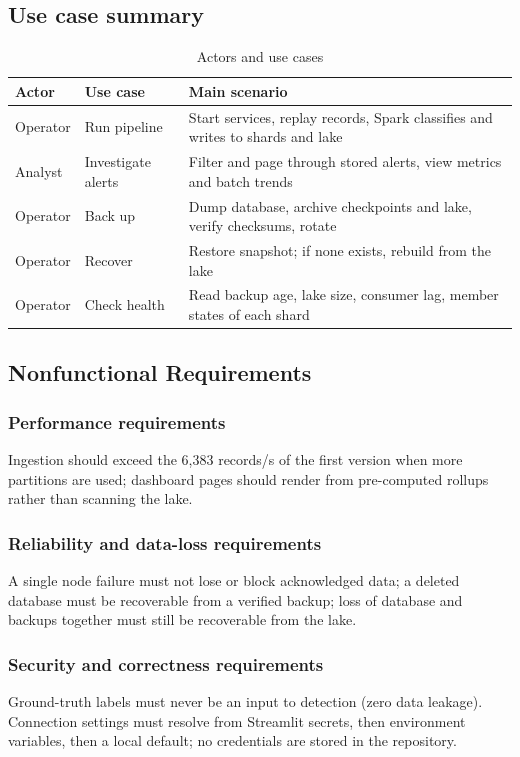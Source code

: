 \subsection{Use case summary}
\begin{table}[H]
\centering
\begin{tabular}{|p{2.6cm}|p{3.2cm}|p{7.5cm}|}
\hline
\textbf{Actor} & \textbf{Use case} & \textbf{Main scenario} \\ \hline
Operator & Run pipeline & Start services, replay records, Spark classifies and writes to shards and lake \\ \hline
Analyst & Investigate alerts & Filter and page through stored alerts, view metrics and batch trends \\ \hline
Operator & Back up & Dump database, archive checkpoints and lake, verify checksums, rotate \\ \hline
Operator & Recover & Restore snapshot; if none exists, rebuild from the lake \\ \hline
Operator & Check health & Read backup age, lake size, consumer lag, member states of each shard \\ \hline
\end{tabular}
\caption{Actors and use cases}
\end{table}

\subsection{Nonfunctional Requirements}
\subsubsection{Performance requirements}
Ingestion should exceed the 6,383 records/s of the first version when more partitions are used; dashboard pages should render from pre-computed rollups rather than scanning the lake.

\subsubsection{Reliability and data-loss requirements}
A single node failure must not lose or block acknowledged data; a deleted database must be recoverable from a verified backup; loss of database and backups together must still be recoverable from the lake.

\subsubsection{Security and correctness requirements}
Ground-truth labels must never be an input to detection (zero data leakage). Connection settings must resolve from Streamlit secrets, then environment variables, then a local default; no credentials are stored in the repository.

